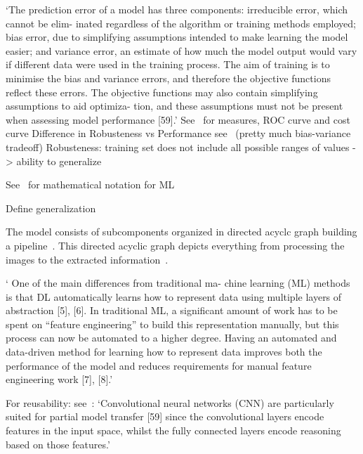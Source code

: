 
`The prediction error of a model has three components: irreducible error, which cannot be elim-
inated regardless of the algorithm or training methods employed; bias error, due to simplifying
assumptions intended to make learning the model easier; and variance error, an estimate of how
much the model output would vary if different data were used in the training process. The aim
of training is to minimise the bias and variance errors, and therefore the objective functions
reflect these errors. The objective functions may also contain simplifying assumptions to aid
optimiza- tion, and these assumptions must not be present when assessing model
performance [59].'\citep{ashmore_assuring_2021}
See~\citep{ashmore_assuring_2021} for measures, ROC curve and cost curve
Difference in Robusteness vs Performance see~\citep{ashmore_assuring_2021} (pretty much
bias-variance tradeoff)
Robusteness: training set does not include all possible ranges of values -> ability to generalize

See~\citep{seshia_formal_2018} for mathematical notation for ML

Define generalization


The model consists of subcomponents organized in directed acyclc graph building a
pipeline~\citep{siebert_construction_2021}.
This directed acyclic graph depicts everything from processing the images to the extracted
information~\citep{siebert_construction_2021}.

` One of the main differences from traditional ma- chine learning (ML) methods is that DL
automatically learns how to represent data using multiple layers of abstraction [5], [6].
In traditional ML, a significant amount of work has to be spent on “feature engineering” to
build this representation manually, but this process can now be automated to a higher degree.
Having an automated and data-driven method for learning how to represent data improves both the
performance of the model and reduces requirements for manual feature engineering work
[7], [8].'~\citep{arpteg_software_2018}


For reusability: see~\citep{ashmore_assuring_2021}: `Convolutional neural networks (CNN) are
particularly suited for partial model transfer [59] since the convolutional layers encode
features in the input space, whilst the fully connected layers encode reasoning based on those
features.'


